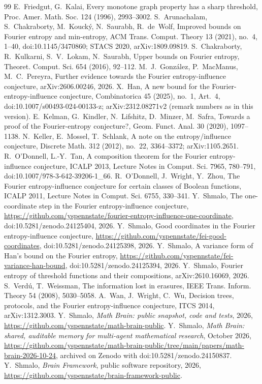 \documentclass[11pt]{amsart}
\theoremstyle{remark}
\begin{document}
\begin{thebibliography}{99}
 E.~Friedgut, G.~Kalai, Every monotone graph property has a sharp threshold, Proc. Amer. Math. Soc.
124 (1996), 2993--3002.
 S.~Arunachalam, S.~Chakraborty, M.~Kouck\'y, N.~Saurabh, R.~de~Wolf, Improved bounds on Fourier
entropy and min-entropy, ACM Trans. Comput. Theory 13 (2021), no.~4, 1--40, doi:10.1145/3470860; STACS 2020, arXiv:1809.09819.
 S.~Chakraborty, R.~Kulkarni, S.~V.~Lokam, N.~Saurabh, Upper bounds on Fourier entropy, Theoret.
Comput. Sci. 654 (2016), 92--112.
 M.~J.~Gonz\'alez, P.~MacManus, M.~C.~Pereyra, Further evidence towards the Fourier
entropy-influence conjecture, arXiv:2606.00246, 2026.
 X.~Han, A new bound for the Fourier-entropy-influence conjecture, Combinatorica 45 (2025), no.~1,
Art.~4, doi:10.1007/s00493-024-00133-z; arXiv:2312.08271v2 (remark numbers as in this version).
 E.~Kelman, G.~Kindler, N.~Lifshitz, D.~Minzer, M.~Safra, Towards a proof of the
Fourier-entropy conjecture?, Geom. Funct. Anal. 30 (2020), 1097--1138.
 N.~Keller, E.~Mossel, T.~Schlank, A note on the entropy/influence conjecture, Discrete Math. 312
(2012), no.~22, 3364--3372; arXiv:1105.2651.
 R.~O'Donnell, L.-Y.~Tan, A composition theorem for the Fourier entropy-influence conjecture, ICALP 2013,
Lecture Notes in Comput. Sci. 7965, 780--791, doi:10.1007/978-3-642-39206-1\_66.
 R.~O'Donnell, J.~Wright, Y.~Zhou, The Fourier entropy-influence conjecture for certain classes of
Boolean functions, ICALP 2011, Lecture Notes in Comput. Sci. 6755, 330--341.
 Y.~Shmalo, The one-coordinate step in the Fourier entropy-influence conjecture,
\url{https://github.com/yspennstate/fourier-entropy-influence-one-coordinate}, doi:10.5281/zenodo.24125404, 2026.
 Y.~Shmalo, Good coordinates in the Fourier entropy-influence conjecture,
\url{https://github.com/yspennstate/fei-good-coordinates}, doi:10.5281/zenodo.24125398, 2026.
 Y.~Shmalo, A variance form of Han's bound on the Fourier entropy,
\url{https://github.com/yspennstate/fei-variance-han-bound}, doi:10.5281/zenodo.24125394, 2026.
 Y.~Shmalo, Fourier entropy of threshold functions and their compositions,
arXiv:2610.16069, 2026.
 S.~Verd\'u, T.~Weissman, The information lost in erasures, IEEE Trans. Inform. Theory 54 (2008),
5030--5058.
 A.~Wan, J.~Wright, C.~Wu, Decision trees, protocols, and the Fourier entropy-influence conjecture, ITCS 2014,
arXiv:1312.3003.
 Y.~Shmalo, \emph{Math Brain: public snapshot, code and tests}, 2026,
\url{https://github.com/yspennstate/math-brain-public}.
 Y.~Shmalo, \emph{Math Brain: shared, auditable memory for multi-agent mathematical research},
October 2026, \url{https://github.com/yspennstate/math-brain-public/tree/main/papers/math-brain-2026-10-24}, archived on Zenodo with doi:10.5281/zenodo.24150837.
 Y.~Shmalo, \emph{Brain Framework}, public software repository, 2026,
\url{https://github.com/yspennstate/brain-framework-public}.
\end{thebibliography}
\end{document}
